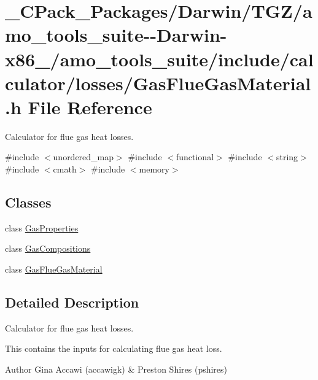 \hypertarget{___c_pack___packages_2_darwin_2_t_g_z_2amo__tools__suite--_darwin-x86__64_2amo__tools__suite_2in462e8df374206efa57345d3e226c8a1a}{}\section{\+\_\+\+C\+Pack\+\_\+\+Packages/\+Darwin/\+T\+G\+Z/amo\+\_\+tools\+\_\+suite-\/-\/\+Darwin-\/x86\+\_/amo\+\_\+tools\+\_\+suite/include/calculator/losses/\+Gas\+Flue\+Gas\+Material.h File Reference}
\label{___c_pack___packages_2_darwin_2_t_g_z_2amo__tools__suite--_darwin-x86__64_2amo__tools__suite_2in462e8df374206efa57345d3e226c8a1a}


Calculator for flue gas heat losses.  


{\ttfamily \#include $<$unordered\+\_\+map$>$}\newline
{\ttfamily \#include $<$functional$>$}\newline
{\ttfamily \#include $<$string$>$}\newline
{\ttfamily \#include $<$cmath$>$}\newline
{\ttfamily \#include $<$memory$>$}\newline
\subsection*{Classes}
\begin{DoxyCompactItemize}
\item 
class \hyperlink{class_gas_properties}{Gas\+Properties}
\item 
class \hyperlink{class_gas_compositions}{Gas\+Compositions}
\item 
class \hyperlink{class_gas_flue_gas_material}{Gas\+Flue\+Gas\+Material}
\end{DoxyCompactItemize}


\subsection{Detailed Description}
Calculator for flue gas heat losses. 

This contains the inputs for calculating flue gas heat loss.

\begin{DoxyAuthor}{Author}
Gina Accawi (accawigk) \& Preston Shires (pshires) 
\end{DoxyAuthor}
